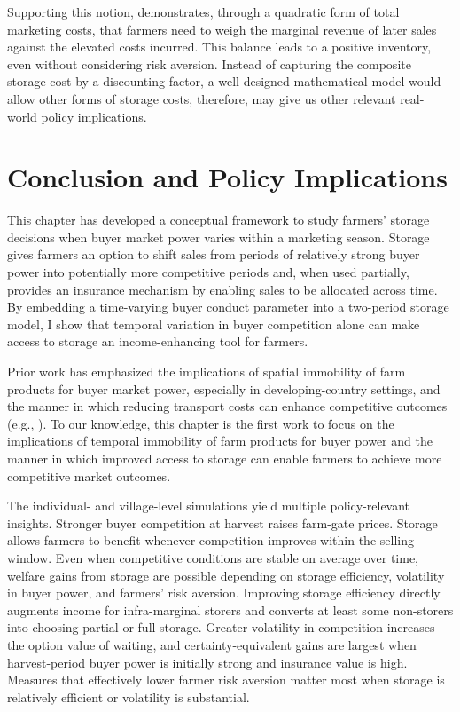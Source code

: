 Supporting this notion, \cite{williams1989economic} demonstrates, through a quadratic form of total marketing costs, that farmers need to weigh the marginal revenue of later sales against the elevated costs incurred. This balance leads to a positive inventory, even without considering risk aversion. Instead of capturing the composite storage cost by a discounting factor, a well-designed mathematical model would allow other forms of storage costs, therefore, may give us other relevant real-world policy implications.


\section{Conclusion and Policy Implications}
\noindent This chapter has developed a conceptual framework to study farmers' storage decisions when buyer market power varies within a marketing season. Storage gives farmers an option to shift sales from periods of relatively strong buyer power into potentially more competitive periods and, when used partially, provides an insurance mechanism by enabling sales to be allocated across time. By embedding a time-varying buyer conduct parameter into a two-period storage model, I show that temporal variation in buyer competition alone can make access to storage an income-enhancing tool for farmers.

Prior work has emphasized the implications of spatial immobility of farm products for buyer market power, especially in developing-country settings, and the manner in which reducing transport costs can enhance competitive outcomes (e.g., \citet{MSS-transport}). To our knowledge, this chapter is the first work to focus on the implications of temporal immobility of farm products for buyer power and the manner in which improved access to storage can enable farmers to achieve more competitive market outcomes.

The individual- and village-level simulations yield multiple policy-relevant insights. Stronger buyer competition at harvest raises farm-gate prices. Storage allows farmers to benefit whenever competition improves within the selling window. Even when competitive conditions are stable on average over time, welfare gains from storage are possible depending on storage efficiency, volatility in buyer power, and farmers' risk aversion. Improving storage efficiency directly augments income for infra-marginal storers and converts at least some non-storers into choosing partial or full storage. Greater volatility in competition increases the option value of waiting, and certainty-equivalent gains are largest when harvest-period buyer power is initially strong and insurance value is high. Measures that effectively lower farmer risk aversion matter most when storage is relatively efficient or volatility is substantial.


